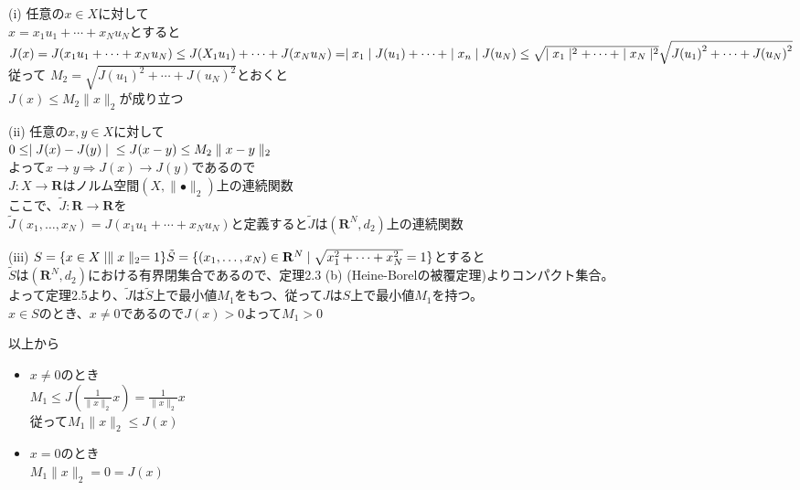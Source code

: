 \documentclass[12pt,a4paper]{article}
\begin{document}
      (i) 任意の$x \in X$に対して\\
      $x = x_1 u_1 + \cdots + x_N u_N$とすると\\
      $J(x) = J(x_1 u_1 + \cdots + x_N u_N) \\
       \leq J(X_1 u_1) + \cdots + J(x_N u_N) \\
       = \mid x_1 \mid J(u_1) + \cdots + \mid x_n \mid J(u_N) \\
       \leq \sqrt{\mid x_1 \mid^2 + \cdots + \mid x_N \mid^2} \sqrt{J{(u_1)}^2 + \cdots + J{(u_N)}^2}$ \\
       従って $M_2 = \sqrt{J{(u_1)}^2 + \cdots + J{(u_N)}^2}$とおくと \\
       $J(x)\leq M_2 \parallel x \parallel_2$が成り立つ

       (ii) 任意の$x, y \in X$に対して\\
       $ 0 \leq \mid J(x) - J(y) \mid \\ \leq J(x - y) \\ \leq M_2 \parallel x - y \parallel_2$ \\
       よって$x \rightarrow y \Rightarrow J(x) \rightarrow J(y)$であるので \\ $J: X \rightarrow \mathbf{R}$はノルム空間$(X, \parallel\bullet\parallel_2)$上の連続関数\\
       ここで、$\tilde{J}: \mathbf{R} \rightarrow \mathbf{R}$を\\
      $\tilde{J}(x_1, \ldots ,x_N) = J(x_1 u_1 + \cdots + x_N u_N)$と定義すると$\tilde{J}$は$(\mathbf{R}^N, d_2)$上の連続関数

      (iii) $S = \lbrace x \in X \mid \parallel x \parallel_2 =1 \rbrace \\ \tilde{S} = \lbrace (x_1, \ldots, x_N) \in \mathbf{R}^N \mid \sqrt{x_1^2 + \cdots + x_N^2} = 1 \rbrace$とすると　\\
      $\tilde{S}$は$(\mathbf{R}^N, d_2)$における有界閉集合であるので、定理2.3 (b) (Heine-Borelの被覆定理)よりコンパクト集合。\\
      よって定理2.5より、$\tilde{J}$は$\tilde{S}$上で最小値$M_1$をもつ、従って$J$は$S$上で最小値$M_1$を持つ。\\
      $x\in S$のとき、$x \neq 0$であるので$J(x) > 0$よって$M_1 > 0$

      以上から
      \begin{itemize}
        \item $x \neq 0$のとき \\
        $M_1 \leq J (\frac{1}{\parallel x \parallel_2} x) = \frac{1}{\parallel x \parallel_2} x$ \\
          従って$M_1\parallel x \parallel_2 \leq J(x)$
        \item $x = 0$のとき \\ $M_1 \parallel x\parallel_2 = 0 = J(x)$
      \end{itemize}
\end{document}
